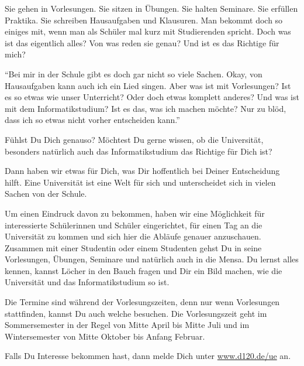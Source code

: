 {Sie gehen in Vorlesungen. Sie sitzen in Übungen. Sie halten Seminare. Sie erfüllen Praktika. Sie schreiben Hausaufgaben und Klausuren. Man bekommt doch so einiges mit, wenn man als Schüler mal kurz mit Studierenden spricht. Doch was ist das eigentlich alles? Von was reden sie genau? Und ist es das Richtige für mich?
}
{"`Bei mir in der Schule gibt es doch gar nicht so viele Sachen. Okay, von Hausaufgaben kann auch ich ein Lied singen. Aber was ist mit Vorlesungen? Ist es so etwas wie unser Unterricht? Oder doch etwas komplett anderes? Und was ist mit dem Informatikstudium? Ist es das, was ich machen möchte? Nur zu blöd, dass ich so etwas nicht vorher entscheiden kann."'



Fühlst Du Dich genauso? Möchtest Du gerne wissen, ob die Universität, besonders natürlich auch das Informatikstudium das Richtige für Dich ist? 

Dann haben wir etwas für Dich, was Dir hoffentlich bei Deiner Entscheidung hilft. Eine Universität ist eine Welt für sich und unterscheidet sich in vielen Sachen von der Schule.

Um einen Eindruck davon zu bekommen, haben wir eine Möglichkeit für interessierte Schülerinnen und Schüler eingerichtet, für einen Tag an die Universität zu kommen und sich hier die Abläufe genauer anzuschauen. Zusammen mit einer Studentin oder einem Studenten gehst Du in seine Vorlesungen, Übungen, Seminare und natürlich auch in die Mensa. Du lernst alles kennen, kannst Löcher in den Bauch fragen und Dir ein Bild machen, wie die Universität und das Informatikstudium so ist.

Die Termine sind während der Vorlesungszeiten, denn nur wenn Vorlesungen stattfinden, kannst Du auch welche besuchen. Die Vorlesungszeit geht im Sommersemester in der Regel von Mitte April bis Mitte Juli und im Wintersemester von Mitte Oktober bis Anfang Februar.

Falls Du Interesse bekommen hast, dann melde Dich unter \url{www.d120.de/ue} an.
}{}


\newpage